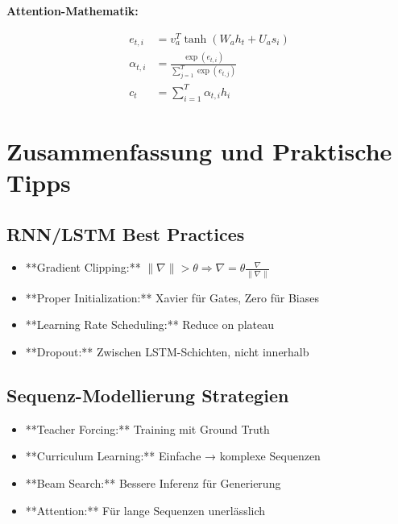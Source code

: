 ﻿\documentclass[12pt,a4paper]{article}
\begin{document}
\textbf{Attention-Mathematik:}

\begin{align}
e_{t,i} &= v_a^T \tanh(W_a h_t + U_a s_i) \\
\alpha_{t,i} &= \frac{\exp(e_{t,i})}{\sum_{j=1}^T \exp(e_{t,j})} \\
c_t &= \sum_{i=1}^T \alpha_{t,i} h_i
\end{align}

\section*{Zusammenfassung und Praktische Tipps}

\subsection*{RNN/LSTM Best Practices}
\begin{itemize}
    \item **Gradient Clipping:** $\|\nabla\| > \theta \Rightarrow \nabla = \theta \frac{\nabla}{\|\nabla\|}$
    \item **Proper Initialization:** Xavier für Gates, Zero für Biases
    \item **Learning Rate Scheduling:** Reduce on plateau
    \item **Dropout:** Zwischen LSTM-Schichten, nicht innerhalb
\end{itemize}

\subsection*{Sequenz-Modellierung Strategien}
\begin{itemize}
    \item **Teacher Forcing:** Training mit Ground Truth
    \item **Curriculum Learning:** Einfache → komplexe Sequenzen
    \item **Beam Search:** Bessere Inferenz für Generierung
    \item **Attention:** Für lange Sequenzen unerlässlich
\end{itemize}
\end{document}
